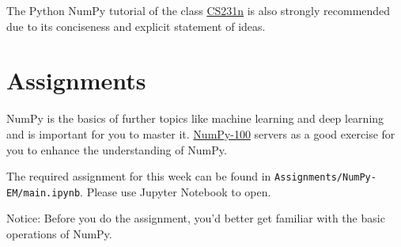 \documentclass[english]{../TexTemplate/thesis}
\begin{document}
The Python NumPy tutorial of the class \href{https://cs231n.github.io/python-numpy-tutorial/}{CS231n} is also strongly recommended due to its conciseness and explicit statement of ideas.

\section{Assignments}
NumPy is the basics of further topics like machine learning and deep learning and is important for you to master it.
\href{https://github.com/rougier/numpy-100}{NumPy-100} servers as a good exercise for you to enhance the understanding of NumPy.

The required assignment for this week can be found in \verb'Assignments/NumPy-EM/main.ipynb'. Please use Jupyter Notebook to open.

Notice: Before you do the assignment, you'd better get familiar with the basic operations of NumPy.
\end{document}
